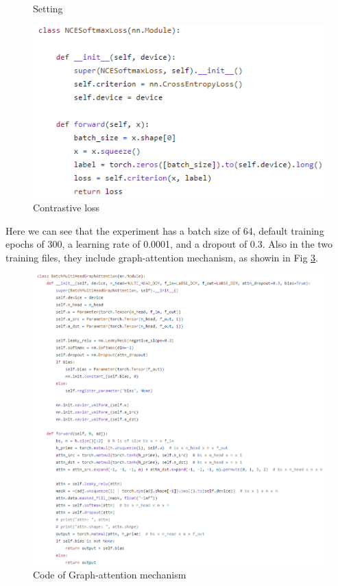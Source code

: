 \documentclass[sigconf]{acmart}
\begin{document}
{\begin{figure}
    \caption{Setting}
    \label{parse}
\end{figure}
\begin{figure}
    \centering
    \includegraphics[width=1\linewidth]{figure/loss.png}
    \caption{Contrastive loss}
    \label{loss}
\end{figure}
Here we can see that the experiment has a batch size of 64, default training epochs of 300, a learning rate of 0.0001, and a dropout of 0.3. Also in the two training files, they include graph-attention mechanism, as showin in Fig \ref{gat}.
\begin{figure}
    \centering
    \includegraphics[width=1\linewidth]{figure/graphattention.png}
    \caption{Code of Graph-attention mechanism}
    \label{gat}
\end{figure}
}
\end{document}
